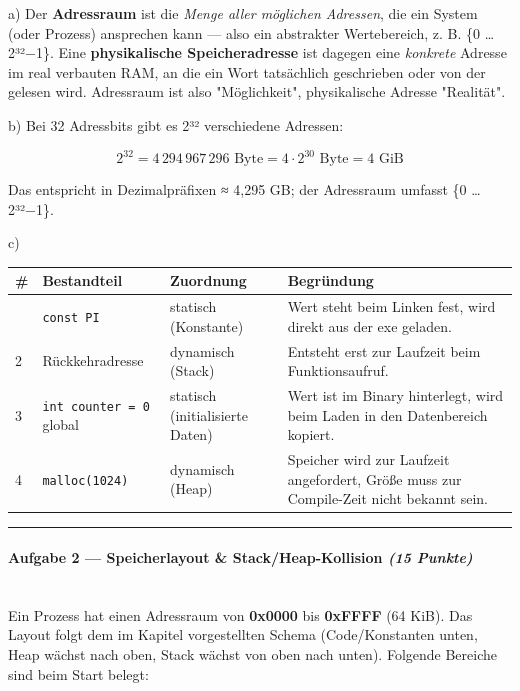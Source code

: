 \documentclass[11pt, a4paper]{article}
\begin{document}
a) Der \textbf{Adressraum} ist die \textit{Menge aller möglichen Adressen}, die ein System (oder Prozess) ansprechen kann — also ein abstrakter Wertebereich, z. B. \{0 … 2³²−1\}. Eine \textbf{physikalische Speicheradresse} ist dagegen eine \textit{konkrete} Adresse im real verbauten RAM, an die ein Wort tatsächlich geschrieben oder von der gelesen wird. Adressraum ist also "Möglichkeit", physikalische Adresse "Realität".


b) Bei 32 Adressbits gibt es 2³² verschiedene Adressen:


\[
2^{32} = 4\,294\,967\,296 \text{ Byte} = 4 \cdot 2^{30} \text{ Byte} = 4 \text{ GiB}
\]


Das entspricht in Dezimalpräfixen ≈ 4,295 GB; der Adressraum umfasst \{0 … 2³²−1\}.


c)



{\small
\begin{tabularx}{\linewidth}{XXXX}
\hline
\rowcolor{tableheadbg}
{\color{white}\textbf{\#}} & {\color{white}\textbf{Bestandteil}} & {\color{white}\textbf{Zuordnung}} & {\color{white}\textbf{Begründung}} \\[2pt]
\hline
\endhead
\hline
\endfoot
1 & \texttt{const PI} & statisch (Konstante) & Wert steht beim Linken fest, wird direkt aus der exe geladen. \\
2 & Rückkehradresse & dynamisch (Stack) & Entsteht erst zur Laufzeit beim Funktionsaufruf. \\
3 & \texttt{int counter = 0} global & statisch (initialisierte Daten) & Wert ist im Binary hinterlegt, wird beim Laden in den Datenbereich kopiert. \\
4 & \texttt{malloc(1024)} & dynamisch (Heap) & Speicher wird zur Laufzeit angefordert, Größe muss zur Compile-Zeit nicht bekannt sein. \\
\end{tabularx}
}



\noindent\textcolor{rulegray}{\rule{\linewidth}{0.4pt}}


\paragraph{Aufgabe 2 — Speicherlayout \& Stack/Heap-Kollision \textit{(15 Punkte)}}\mbox{}\\[2pt]

Ein Prozess hat einen Adressraum von \textbf{0x0000} bis \textbf{0xFFFF} (64 KiB). Das Layout folgt dem im Kapitel vorgestellten Schema (Code/Konstanten unten, Heap wächst nach oben, Stack wächst von oben nach unten). Folgende Bereiche sind beim Start belegt:
\end{document}

